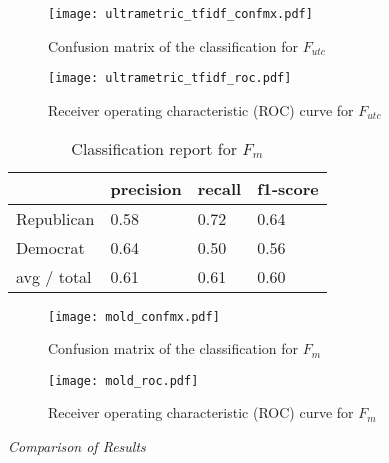 \documentclass[10pt,11pt,12pt,oneside]{book}
\begin{document}
\begin{figure}[H]
	\begin{center}
		\texttt{[image: ultrametric\_tfidf\_confmx.pdf]}\\
		\caption{Confusion matrix of the classification for $ F_{utc} $}
	\end{center}
\end{figure}

\begin{figure}[H]
	\begin{center}
		\texttt{[image: ultrametric\_tfidf\_roc.pdf]}\\
		\caption{Receiver operating characteristic (ROC) curve for $ F_{utc} $}
	\end{center}
\end{figure}



\newpage
\vspace{0.5cm}
\begin{table}[H]
	\begin{tabular}{ | p{5cm} || p{3cm} | p{3cm} | p{3cm} |}
		\hline
		& precision & recall & f1-score\\
		\hline
		Republican & 0.58 & 0.72 & 0.64\\
		\hline
		Democrat & 0.64 & 0.50 & 0.56\\  
		\hline
		avg / total  & 0.61 & 0.61 & 0.60 \\
		\hline
	\end{tabular}
	\caption{Classification report for $ F_{m} $}
	\label{cr_mold}
\end{table}

\begin{figure}[H]
	\begin{center}
		\texttt{[image: mold\_confmx.pdf]}\\
		\caption{Confusion matrix of the classification for $ F_{m} $}
	\end{center}
\end{figure}

\begin{figure}[H]
	\begin{center}
		\texttt{[image: mold\_roc.pdf]}\\
		\caption{Receiver operating characteristic (ROC) curve for $ F_{m} $}
	\end{center}
\end{figure}
\clearpage
\newpage
\vspace*{0.2cm}
\textit{Comparison of Results}\\
\end{document}
